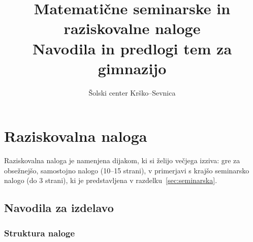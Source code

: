 \documentclass[11pt,a4paper]{article}
\title{\textbf{Matematične seminarske in raziskovalne naloge}\\[4pt]\large Navodila in predlogi tem za gimnazijo}
\author{Šolski center Krško--Sevnica}
\date{}
\begin{document}
\maketitle
\tableofcontents
\newpage

\section{Raziskovalna naloga}

Raziskovalna naloga je namenjena dijakom, ki si želijo večjega izziva: gre za obsežnejšo, samostojno nalogo (10--15 strani), v primerjavi s krajšo seminarsko nalogo (do 3 strani), ki je predstavljena v razdelku~\ref{sec:seminarska}.

\subsection{Navodila za izdelavo}

\subsubsection*{Struktura naloge}
\end{document}
